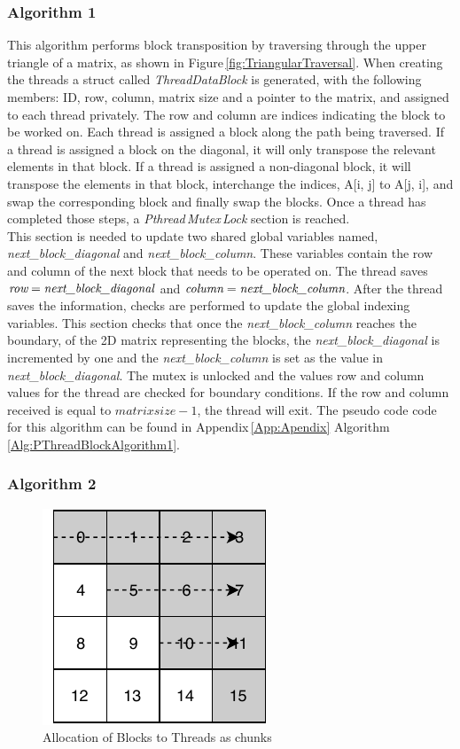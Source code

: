 \documentclass[10pt, onecolumn]{article}
\begin{document}
\subsubsection{Algorithm 1}
%
This algorithm performs block transposition by traversing through the upper triangle of a matrix, as shown in Figure\,\ref{fig:TriangularTraversal}. When creating the threads a struct called \emph{ThreadDataBlock} is generated, with the following members: ID, row, column, matrix size and a pointer to the matrix, and assigned to each thread privately. The row and column are indices indicating the block to be worked on. Each thread is assigned a block along the path being traversed. If a thread is assigned a block on the diagonal, it will only transpose the relevant elements in that block. If a thread is assigned a non-diagonal block, it will transpose the elements in that block, interchange the indices, A[i, j] to A[j, i], and swap the corresponding block and finally swap the blocks. Once a thread has completed those steps, a \emph{Pthread\,Mutex\,Lock} section is reached.\\

\noindent This section is needed to update two shared global variables named, \emph{next\_block\_diagonal} and \emph{next\_block\_column}. These variables contain the row and column of the next block that needs to be operated on. The thread saves $\emph{row} = \emph{next\_block\_diagonal}$ and $\emph{column} = \emph{next\_block\_column}$. After the thread saves the information, checks are performed to update the global indexing variables. This section checks that once the \emph{next\_block\_column} reaches the boundary, of the 2D matrix representing the blocks, the \emph{next\_block\_diagonal} is incremented by one and the \emph{next\_block\_column} is set as the value in \emph{next\_block\_diagonal}. The mutex is unlocked and the values row and column values for the thread are checked for boundary conditions. If the row and column received is equal to $matrix size - 1$, the thread will exit. The pseudo code code for this algorithm can be found in Appendix\,\ref{App:Apendix} Algorithm\,\ref{Alg:PThreadBlockAlgorithm1}.
%
\subsubsection{Algorithm 2}
%
\begin{figure}[H]
    \centering
    \includegraphics{Documentation/BlockAlgorithm2ThreadAllocation.pdf}
    \caption{Allocation of Blocks to Threads as chunks}
    \label{fig:BlockAlgorithm2ThreadAllocation}
\end{figure}
%
\end{document}
